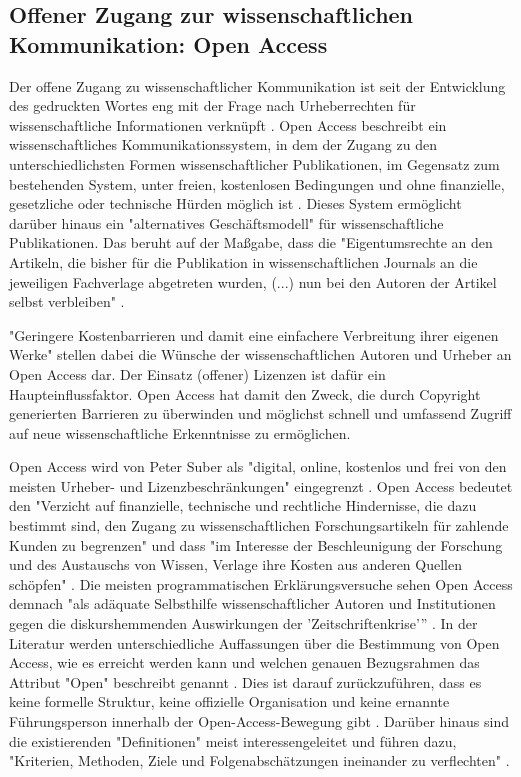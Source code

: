 \subsection{Offener Zugang zur wissenschaftlichen Kommunikation: Open Access}

Der offene Zugang zu wissenschaftlicher Kommunikation ist seit der Entwicklung des gedruckten Wortes eng mit der Frage nach Urheberrechten für wissenschaftliche Informationen verknüpft \cite{Case_2000}. Open Access beschreibt ein wissenschaftliches Kommunikationssystem, in dem der Zugang zu den unterschiedlichsten Formen wissenschaftlicher Publikationen, im Gegensatz zum bestehenden System, unter freien, kostenlosen Bedingungen und ohne finanzielle, gesetzliche oder technische Hürden möglich ist \cite{Cloes_2009}. Dieses System ermöglicht darüber hinaus ein "alternatives Geschäftsmodell"\cite{Lewis_2012} für wissenschaftliche Publikationen. Das beruht auf der Maßgabe, dass die "Eigentumsrechte an den Artikeln, die bisher für die Publikation in wissenschaftlichen Journals an die jeweiligen Fachverlage abgetreten wurden, (...) nun bei den Autoren der Artikel selbst verbleiben" \cite{Hess_2006}.

"Geringere Kostenbarrieren und damit eine einfachere Verbreitung ihrer eigenen Werke" \cite{Cloes_2009} stellen dabei die Wünsche der wissenschaftlichen Autoren und Urheber an Open Access dar. Der Einsatz (offener) Lizenzen ist dafür ein Haupteinflussfaktor. Open Access hat damit den Zweck, die durch Copyright generierten Barrieren zu überwinden und möglichst schnell und umfassend Zugriff auf neue wissenschaftliche Erkenntnisse zu ermöglichen.

Open Access wird von Peter Suber als "digital, online, kostenlos und frei von den meisten Urheber- und Lizenzbeschränkungen"  eingegrenzt \cite{Adema_2014}. Open Access bedeutet den "Verzicht auf finanzielle, technische und rechtliche Hindernisse, die dazu bestimmt sind, den Zugang zu wissenschaftlichen Forschungsartikeln für zahlende Kunden zu begrenzen" und dass "im Interesse der Beschleunigung der Forschung und des Austauschs von Wissen, Verlage ihre Kosten aus anderen Quellen schöpfen" \cite{Suber_2002}. Die meisten programmatischen Erklärungsversuche sehen Open Access demnach "als adäquate Selbsthilfe wissenschaftlicher Autoren und Institutionen gegen die diskurshemmenden Auswirkungen der 'Zeitschriftenkrise'” \cite[:105]{Naeder_2010}. In der Literatur werden unterschiedliche Auffassungen über die Bestimmung von Open Access, wie es erreicht werden kann und welchen genauen Bezugsrahmen das Attribut "Open" beschreibt genannt \cite{Adema_2014} \cite{Herb_2012a}. Dies ist darauf zurückzuführen, dass es keine formelle Struktur, keine offizielle Organisation und keine ernannte Führungsperson innerhalb der Open-Access-Bewegung gibt \cite{Poynder_2011}. Darüber hinaus sind die existierenden "Definitionen" meist interessengeleitet und führen dazu, "Kriterien, Methoden, Ziele und Folgenabschätzungen ineinander zu verflechten" \cite[:105]{Naeder_2010}.

